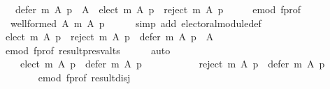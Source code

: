 \begin{isabellebody}
\ \ \ {\isachardoublequoteopen}defer\ m\ A\ p\ {\isacharequal}{\kern0pt}\ A\ {\isacharminus}{\kern0pt}\ {\isacharparenleft}{\kern0pt}elect\ m\ A\ p{\isacharparenright}{\kern0pt}\ {\isacharminus}{\kern0pt}\ {\isacharparenleft}{\kern0pt}reject\ m\ A\ p{\isacharparenright}{\kern0pt}{\isachardoublequoteclose}\isanewline
%
\isadelimproof
%
\endisadelimproof
%
\isatagproof
{}\isamarkupfalse%
\ {\isacharminus}{\kern0pt}\isanewline
\ \ \isamarkupfalse%
\ e{\isacharunderscore}{\kern0pt}mod\ f{\isacharunderscore}{\kern0pt}prof\ \isamarkupfalse%
\ {}{\isacharcolon}{\kern0pt}\ {\isachardoublequoteopen}well{\isacharunderscore}{\kern0pt}formed\ A\ {\isacharparenleft}{\kern0pt}m\ A\ p{\isacharparenright}{\kern0pt}{\isachardoublequoteclose}\isanewline
\ \ \ \ \isamarkupfalse%
\ {\isacharparenleft}{\kern0pt}simp\ add{\isacharcolon}{\kern0pt}\ electoral{\isacharunderscore}{\kern0pt}module{\isacharunderscore}{\kern0pt}def{\isacharparenright}{\kern0pt}\isanewline
\ \ \isamarkupfalse%
\ {\isachardoublequoteopen}{\isacharparenleft}{\kern0pt}elect\ m\ A\ p{\isacharparenright}{\kern0pt}\ {\isasymunion}\ {\isacharparenleft}{\kern0pt}reject\ m\ A\ p{\isacharparenright}{\kern0pt}\ {\isasymunion}\ {\isacharparenleft}{\kern0pt}defer\ m\ A\ p{\isacharparenright}{\kern0pt}\ {\isacharequal}{\kern0pt}\ A{\isachardoublequoteclose}\isanewline
\ \ \ \ \isamarkupfalse%
\ e{\isacharunderscore}{\kern0pt}mod\ f{\isacharunderscore}{\kern0pt}prof\ result{\isacharunderscore}{\kern0pt}presv{\isacharunderscore}{\kern0pt}alts\isanewline
\ \ \ \ \isamarkupfalse%
\ auto\isanewline
\ \ \isamarkupfalse%
\ \isamarkupfalse%
\ {}\ \isamarkupfalse%
\isanewline
\ \ \ \ {\isachardoublequoteopen}{\isacharparenleft}{\kern0pt}elect\ m\ A\ p{\isacharparenright}{\kern0pt}\ {\isasyminter}\ {\isacharparenleft}{\kern0pt}defer\ m\ A\ p{\isacharparenright}{\kern0pt}\ {\isacharequal}{\kern0pt}\ {\isacharbraceleft}{\kern0pt}{\isacharbraceright}{\kern0pt}\ {\isasymand}\isanewline
\ \ \ \ \ \ \ \ {\isacharparenleft}{\kern0pt}reject\ m\ A\ p{\isacharparenright}{\kern0pt}\ {\isasyminter}\ {\isacharparenleft}{\kern0pt}defer\ m\ A\ p{\isacharparenright}{\kern0pt}\ {\isacharequal}{\kern0pt}\ {\isacharbraceleft}{\kern0pt}{\isacharbraceright}{\kern0pt}{\isachardoublequoteclose}\isanewline
\ \ \ \ \ \ \isamarkupfalse%
\ e{\isacharunderscore}{\kern0pt}mod\ f{\isacharunderscore}{\kern0pt}prof\ result{\isacharunderscore}{\kern0pt}disj\isanewline

\end{isabellebody}

